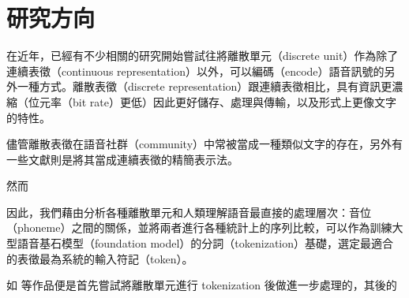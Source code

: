 
\section{研究方向}

在近年，已經有不少相關的研究開始嘗試往將離散單元（discrete unit）作為除了連續表徵（continuous representation）以外，可以編碼（encode）語音訊號的另外一種方式。離散表徵（discrete representation）跟連續表徵相比，具有資訊更濃縮（位元率（bit rate）更低）因此更好儲存、處理與傳輸，以及形式上更像文字的特性。

儘管離散表徵在語音社群（community）中常被當成一種類似文字的存在，另外有一些文獻則是將其當成連續表徵的精簡表示法。

然而

因此，我們藉由分析各種離散單元和人類理解語音最直接的處理層次：音位（phoneme）之間的關係，並將兩者進行各種統計上的序列比較，可以作為訓練大型語音基石模型（foundation model）的分詞（tokenization）基礎，選定最適合的表徵最為系統的輸入符記（token）。

如 \cite{wu2023wav2seq} 等作品便是首先嘗試將離散單元進行 tokenization 後做進一步處理的，其後的
